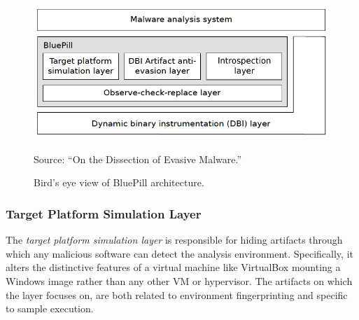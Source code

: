 \documentclass[LaM,binding=0.6cm]{sapthesis}
\newcommand{\source}[1]{\caption*{Source: {#1}} }
\begin{document}
\begin{figure}[h!]
\centering
\includegraphics[scale=.6]{images/techn8}
\caption{Bird's eye view of BluePill architecture.}
\source{``On the Dissection of Evasive Malware.''}
\end{figure}

\subsubsection{Target Platform Simulation Layer}
\label{subsec:targetplatformsimulation}
The \textit{target platform simulation layer} is responsible for hiding artifacts through which any malicious software can detect the analysis environment. Specifically, it alters the distinctive features of a virtual machine like VirtualBox mounting a Windows image rather than any other VM or hypervisor. The artifacts on which the layer focuses on, are both related to environment fingerprinting and specific to sample execution.
\end{document}
